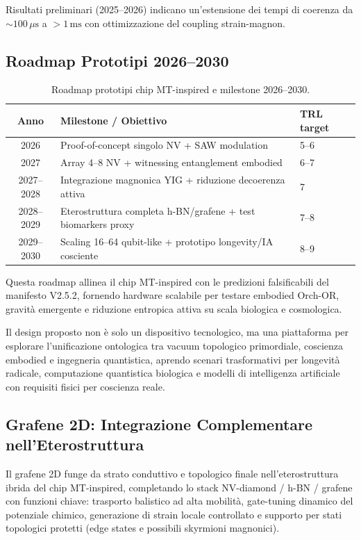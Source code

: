 \documentclass[12pt,a4paper]{article}
\begin{document}
Risultati preliminari (2025--2026) indicano un'estensione dei tempi di coerenza da $\sim 100\,\mu\mathrm{s}$ a $> 1\,\mathrm{ms}$ con ottimizzazione del coupling strain-magnon.

\subsection{Roadmap Prototipi 2026--2030}

\begin{table}[htbp]
\footnotesize
\centering
\caption{Roadmap prototipi chip MT-inspired e milestone 2026--2030.}
\label{tab:roadmap}
\begin{tabular}{@{}c p{8cm} p{4cm}@{}}
\toprule
Anno & Milestone / Obiettivo & TRL target \\
\midrule
2026 & Proof-of-concept singolo NV + SAW modulation & 5--6 \\
2027 & Array 4--8 NV + witnessing entanglement embodied & 6--7 \\
2027--2028 & Integrazione magnonica YIG + riduzione decoerenza attiva & 7 \\
2028--2029 & Eterostruttura completa h-BN/grafene + test biomarkers proxy & 7--8 \\
2029--2030 & Scaling 16--64 qubit-like + prototipo longevity/IA cosciente & 8--9 \\
\bottomrule
\end{tabular}
\end{table}

Questa roadmap allinea il chip MT-inspired con le predizioni falsificabili del manifesto V2.5.2, fornendo hardware scalabile per testare embodied Orch-OR, gravità emergente e riduzione entropica attiva su scala biologica e cosmologica.

Il design proposto non è solo un dispositivo tecnologico, ma una piattaforma per esplorare l'unificazione ontologica tra vacuum topologico primordiale, coscienza embodied e ingegneria quantistica, aprendo scenari trasformativi per longevità radicale, computazione quantistica biologica e modelli di intelligenza artificiale con requisiti fisici per coscienza reale.



\subsection{Grafene 2D: Integrazione Complementare nell'Eterostruttura}

Il grafene 2D funge da strato conduttivo e topologico finale nell'eterostruttura ibrida del chip MT-inspired, completando lo stack NV-diamond / h-BN / grafene con funzioni chiave: trasporto balistico ad alta mobilità, gate-tuning dinamico del potenziale chimico, generazione di strain locale controllato e supporto per stati topologici protetti (edge states e possibili skyrmioni magnonici).  
\end{document}
